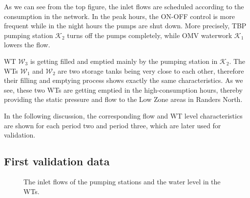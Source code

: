   As we can see from the top figure, the inlet flows are scheduled according to the consumption in the network. In the peak hours, the ON-OFF control is more frequent while in the night hours the pumps are shut down. More precisely, TBP pumping station $\mathcal{K}_2$ turns off the pumps completely, while OMV waterwork $\mathcal{K}_1$ lowers the flow. 

  WT $\mathcal{W}_3$ is getting filled and emptied mainly by the pumping station in $\mathcal{K}_2$. The WTs $\mathcal{W}_1$ and $\mathcal{W}_2$ are two storage tanks being very close to each other, therefore their filling and emptying process shows exactly the same characteristics. As we see, these two WTs are getting emptied in the high-consumption hours, thereby providing the static pressure and flow to the Low Zone areas in Randers North. 

  In the following discussion, the corresponding flow and WT level characteristics are shown for each period two and period three, which are later used for validation. 
\vspace{-3mm}
\subsection{First validation data}
\label{first_validation}
 \vspace{-3mm}

  \begin{figure}[H]
  \centering
   
  \label{fig:inlet_flows_p2}
  \end{figure}
 \vspace{-8mm}


  \begin{figure}[H]
  \centering
   
  \label{fig:w3_p2}
  \end{figure}
 \vspace{-8mm}


  \begin{figure}[H]
  \centering
   
  \vspace{-2.5mm}
  \caption{The inlet flows of the pumping stations and the water level in the WTs.}
  \label{fig:w1_w2_p2}
  \end{figure}
  \vspace{-3mm}

